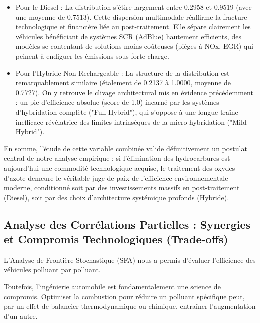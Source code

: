 \vspace{0.6em}

\begin{itemize}
    \item Pour le Diesel : La distribution s'étire largement entre 0.2958 et 0.9519 (avec une moyenne de 0.7513). Cette dispersion multimodale réaffirme la fracture technologique et financière liée au post-traitement. Elle sépare clairement les véhicules bénéficiant de systèmes SCR (AdBlue) hautement efficients, des modèles se contentant de solutions moins coûteuses (pièges à NOx, EGR) qui peinent à endiguer les émissions sous forte charge.

    \vspace{0.5em}

    \item Pour l'Hybride Non-Rechargeable : La structure de la distribution est remarquablement similaire (étalement de 0.2137 à 1.0000, moyenne de 0.7727). On y retrouve le clivage architectural mis en évidence précédemment : un pic d'efficience absolue (score de 1.0) incarné par les systèmes d'hybridation complète ("Full Hybrid"), qui s'oppose à une longue traîne inefficace révélatrice des limites intrinsèques de la micro-hybridation ("Mild Hybrid").
\end{itemize}

\vspace{0.6em}

En somme, l'étude de cette variable combinée valide définitivement un postulat central de notre analyse empirique : si l'élimination des hydrocarbures est aujourd'hui une commodité technologique acquise, le traitement des oxydes d'azote demeure le véritable juge de paix de l'efficience environnementale moderne, conditionné soit par des investissements massifs en post-traitement (Diesel), soit par des choix d'architecture systémique profonds (Hybride).

\subsection{Analyse des Corrélations Partielles : Synergies et Compromis Technologiques (Trade-offs)}

L'Analyse de Frontière Stochastique (SFA) nous a permis d'évaluer l'efficience des véhicules polluant par polluant.

\vspace{0.6em}

Toutefois, l'ingénierie automobile est fondamentalement une science de compromis. Optimiser la combustion pour réduire un polluant spécifique peut, par un effet de balancier thermodynamique ou chimique, entraîner l'augmentation d'un autre.

